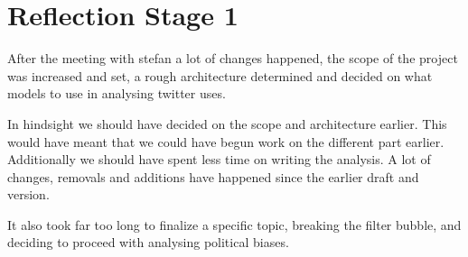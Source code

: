 \section{Reflection Stage 1}
After the meeting with stefan a lot of changes happened, the scope of the
project was increased and set, a rough architecture determined and decided on
what models to use in analysing twitter uses.\nl

In hindsight we should have decided on the scope and architecture earlier. This
would have meant that we could have begun work on the different part earlier.
Additionally we should have spent less time on writing the analysis. A lot of
changes, removals and additions have happened since the earlier draft and
version.

It also took far too long to finalize a specific topic, breaking the
filter bubble, and deciding to proceed with analysing political biases. 
